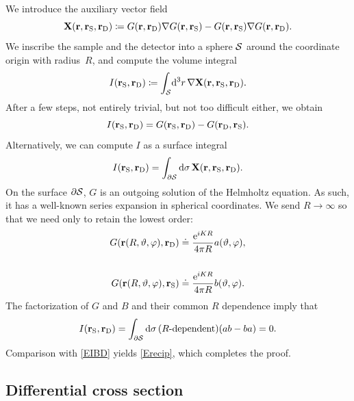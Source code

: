 We introduce the auxiliary vector field
\begin{equation}
  \mathbf{X}(\mathbf{r},\mathbf{r}_\text{S},\mathbf{r}_\text{D})\coloneqq G(\mathbf{r},\mathbf{r}_\text{D})\mathbf{\nabla} G(\mathbf{r},\mathbf{r}_\text{S}) - G(\mathbf{r},\mathbf{r}_\text{S})\mathbf{\nabla} G(\mathbf{r},\mathbf{r}_\text{D}).
\end{equation}
We inscribe the sample and the detector
into a sphere $\mathcal{S}$ around the coordinate origin with radius~$R$,
and compute the volume integral
\begin{equation}\label{Eprerecipro}
    I(\mathbf{r}_\text{S},\mathbf{r}_\text{D}) \coloneqq \displaystyle\int_{\mathcal{S}}\!\mathrm d^3r\,\mathbf{\nabla} \mathbf{X}(\mathbf{r},\mathbf{r}_\text{S},\mathbf{r}_\text{D}).
\end{equation}
After a few steps, not entirely trivial, but not too difficult either,
we obtain
\begin{equation}\label{EIBD}
  I(\mathbf{r}_\text{S},\mathbf{r}_\text{D}) = G(\mathbf{r}_\text{S},\mathbf{r}_\text{D}) - G(\mathbf{r}_\text{D},\mathbf{r}_\text{S}).
\end{equation}
Alternatively, we can compute $I$ as a surface integral
\begin{equation}
  I(\mathbf{r}_\text{S},\mathbf{r}_\text{D})
  =\displaystyle\int_{\partial\mathcal{S}}\mathrm d\mathbf{\sigma}\,\mathbf{X}(\mathbf{r},\mathbf{r}_\text{S},\mathbf{r}_\text{D}).
\end{equation}
On the surface $\partial\mathcal{S}$,
$G$ is an outgoing solution of the Helmholtz equation.
As such, it has a well-known series expansion in spherical coordinates.
We send $R\to\infty$ so that we need only to retain the lowest order:
\begin{align}
   G(\mathbf{r}(R,\vartheta,\varphi),\mathbf{r}_\text{D})
   &\doteq\displaystyle \frac{\mathrm e^{iKR}}{4\pi R} a(\vartheta,\varphi),
   \\[3.8ex]
   G(\mathbf{r}(R,\vartheta,\varphi),\mathbf{r}_\text{S})
   &\doteq\displaystyle \frac{\mathrm e^{iKR}}{4\pi R} b(\vartheta,\varphi).
\end{align}
The factorization of $G$ and $B$ and their common $R$ dependence imply that
\begin{equation}
  I(\mathbf{r}_\text{S},\mathbf{r}_\text{D})
  =\displaystyle\int_{\partial\mathcal{S}}\mathrm d\sigma\,
       (\text{$R$-dependent})(ab-ba)
  = 0.
\end{equation}
Comparison with \cref{EIBD} yields \cref{Erecip},
which completes the proof.

%
%
\fi

\subsection{Differential cross section}\label{SdiffCross}

